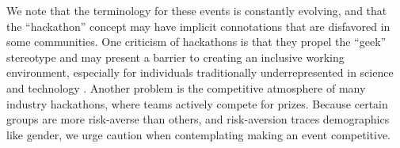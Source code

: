 We note that the terminology for these events is constantly evolving, and that the ``hackathon'' concept may have implicit connotations that are disfavored in some communities.
One criticism of hackathons is that they propel the ``geek'' stereotype and may present a barrier to creating an inclusive working environment, especially for individuals traditionally underrepresented in science and technology \cite{Decker2015}.
Another problem is the competitive atmosphere of many industry hackathons, where teams actively compete for prizes.
Because certain groups are more risk-averse than others, and risk-aversion traces demographics like gender, we urge caution when contemplating making an event competitive.
